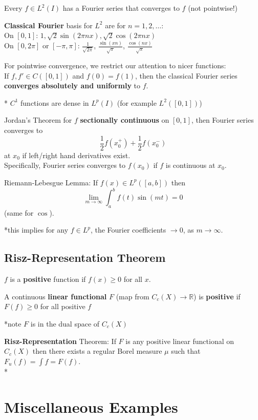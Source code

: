 \documentclass[a4paper, 12pt]{article}
\def\R{\ensuremath{\mathbb{R}}} %
\newcommand{\bt}[1]{\textbf{#1}} %
\newcommand{\gray}[1]{{\leavevmode\color[gray]{0.5}{#1}}} %
\begin{document}
\begin{multicols}{2}
Every $f \in L^2(I)$ has a Fourier series that converges to $f$ 
(not pointwise!)

\bt{Classical Fourier} basis for $L^2$ are for $n = 1, 2, \dots$: \\
On $[0, 1]$: $1, \sqrt{2}\sin(2 \pi nx), \sqrt{2}\cos(2\pi nx)$ \\
On $[0, 2\pi]$ or $[-\pi, \pi]$: $\frac{1}{\sqrt{2\pi}}$, 
$\frac{\sin(xn)}{\sqrt{\pi}}$, $\frac{\cos(nx)}{\sqrt{\pi}}$

For pointwise convergence, we restrict our attention to nicer functions:\\
If $f, f' \in C([0, 1])$ and $f(0) = f(1)$, then the classical Fourier series
\bt{converges absolutely and uniformly} to $f$.

* $C^1$ functions are dense in $L^p(I)$ (for example $L^2([0, 1])$)


Jordan's Theorem for $f$ \bt{sectionally continuous} on $[0, 1]$, then 
Fourier series converges to 
$$\frac{1}{2}f(x_0^+) + \frac{1}{2} f(x_0^-)$$
at $x_0$ if left/right hand derivatives exist. \\
Specifically, Fourier series converges to $f(x_0)$ if $f$ is continuous 
at $x_0$.


Riemann-Lebesgue Lemma: If $f(x) \in L^p([a, b])$ then 
$$\lim_{m \rightarrow \infty} \int_a^b f(t) \sin(mt) = 0$$
(same for $\cos$).

*this implies for any $f \in L^p$, the Fourier coefficients $\rightarrow 0$, 
as $m \rightarrow \infty$.

\subsection{Risz-Representation Theorem}

$f$ is a \bt{positive} function if $f(x) \geq 0$ for all $x$.

A continuous \bt{linear functional} $F$ (map from $C_c(X) \rightarrow \R$)
is \bt{positive} if $F(f) \geq 0$ for all positive $f$

*note $F$ is in the dual space of $C_c(X)$

\bt{Risz-Representation} Theorem: If $F$ is any positive linear functional 
on $C_c(X)$ then there exists a regular Borel measure $\mu$ such that 
$F_u(f) = \int f = F(f)$. \\
*\gray{can show map is linear: $F(af + bg) = aF(f) + bF(g)$.}


\section{Miscellaneous Examples}


\end{multicols}
\end{document}

